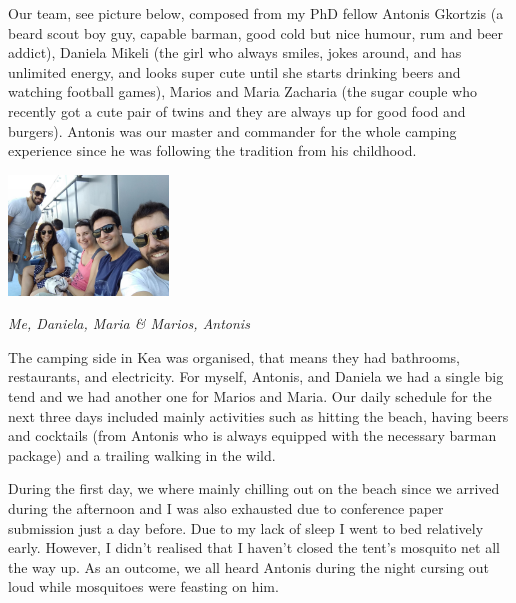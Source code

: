\documentclass[10pt,a4paper]{article} %
\begin{document}
\begin{multicols}{3}
Our team, see picture below, composed from my PhD fellow Antonis Gkortzis 
(a beard scout boy guy, capable barman, good cold but nice humour, rum and beer addict), 
Daniela Mikeli (the girl who always smiles, jokes around, and has unlimited energy, 
and looks super cute until she starts drinking beers and watching football games), 
Marios and Maria Zacharia (the sugar couple who recently got a cute pair of twins 
and they are always up for good food and burgers).  
Antonis was our master and commander for the whole camping experience since he was 
following the tradition from his childhood. 


\begin{center}
	\includegraphics[width=0.32\textwidth]{media/the_dream_team.jpg}
	\par\textit{Me, Daniela, Maria \& Marios, Antonis}
\end{center}


The camping side in Kea was organised, that means they had bathrooms, restaurants, 
and electricity. 
For myself, Antonis, and Daniela we had a single big tend and we had another one for 
Marios and Maria. 
Our daily schedule for the next three days included mainly activities such as hitting 
the beach, having beers and cocktails (from Antonis who is always equipped with the 
necessary barman package) and a trailing walking in the wild.


During the first day, we where mainly chilling out on the beach since 
we arrived during the afternoon and I was also exhausted due to conference 
paper submission just a day before. 
Due to my lack of sleep I went to bed relatively early. 
However, I didn't realised that I haven't closed the tent's mosquito net all the 
way up.  
As an outcome, we all heard Antonis during the night cursing out loud while mosquitoes 
were feasting on him.  


\end{multicols}
\end{document}
